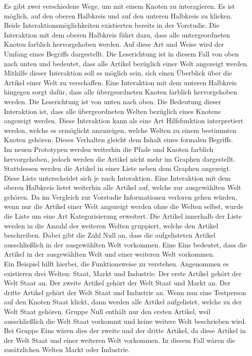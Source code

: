 Es gibt zwei verschiedene Wege, um mit einem Knoten zu interagieren.
Es ist möglich, auf den oberen Halbkreis und auf den unteren Halbkreis zu klicken.
Beide Interaktionsmöglichkeiten existierten bereits in der Vorstudie.
Die Interaktion mit dem oberen Halbkreis führt dazu, dass alle untergeordneten Knoten farblich hervorgehoben werden.
Auf diese Art und Weise wird der Umfang eines Begriffs dargestellt.
Die Leserichtung ist in diesem Fall von oben nach unten und bedeutet, dass alle Artikel bezüglich einer Welt angezeigt werden.
Mithilfe dieser Interaktion soll es möglich sein, sich einen Überblick über die Artikel einer Welt zu verschaffen.
Eine Interaktion mit dem unteren Halbkreis hingegen sorgt dafür, dass alle übergeordneten Knoten farblich hervorgehoben werden.
Die Leserichtung ist von unten nach oben.
Die Bedeutung dieser Interaktion ist, dass alle übergeordneten Welten bezüglich eines Knotens angezeigt werden.
Diese Interaktion kann als eine Art Hilfsfunktion interpretiert werden, welche es ermöglicht anzuzeigen, welche Welten zu einem bestimmten Knoten gehören.
Dieses Verhalten gleicht dem Inhalt eines formalen Begriffs.\\

Im neuen Prototypen werden weiterhin die Pfade und Knoten farblich hervorgehoben, jedoch werden die Artikel nicht mehr im Graphen dargestellt.
Stattdessen werden die Artikel in einer Liste neben dem Graphen angezeigt.
Diese Liste unterscheidet sich je nach Interaktion.
Eine Interaktion mit dem oberen Halbkreis listet weiterhin alle Artikel auf, welche zur ausgewählten Welt gehören.
Da im Vergleich zur Vorstudie Informationen verloren gehen würden, wenn nur die Artikel einer Welt angezeigt werden ohne die Welten selbst, wurde die Liste um eine Art Kategorisierung erweitert.
Die Artikel innerhalb der Liste werden in die Anzahl der weiteren Welten gruppiert, welche den Artikel beschreiben.
Dabei gibt die Zahl Null an, dass die aufgelisteten Artikel ausschließlich in der ausgewählten Welt vorkommen.
Eine Eins bedeutet, dass die Artikel in der ausgewählten Welt und einer weiteren Welt vorkommen.\\

Ein Beispiel hilft hierbei, die Funktionsweise zu verstehen.
Angenommen es existieren drei Welten: Staat, Markt und Industrie.
Der erste Artikel gehört der Welt Staat an.
Der zweite Artikel gehört der Welt Staat und Markt an.
Der dritte Artikel gehört der Welt Staat und Industrie an.
Wenn nun eine Testperson auf den Knoten Staat klickt, dann werden alle Artikel aufgelistet, welche zu der Welt Staat gehören.
Gruppe Null enthält nur den ersten Artikel, weil ausschließlich die Welt Staat vorkommt und keine weitere Welt beschrieben wird.
Bei Gruppe Eins wären dies der zweite und der dritte Artikel, da diese Artikel in der Welt Staat und einer weiteren Welt vorkommen.
In diesem Fall wären die zusätzlichen Welten Markt oder Industrie.\\

